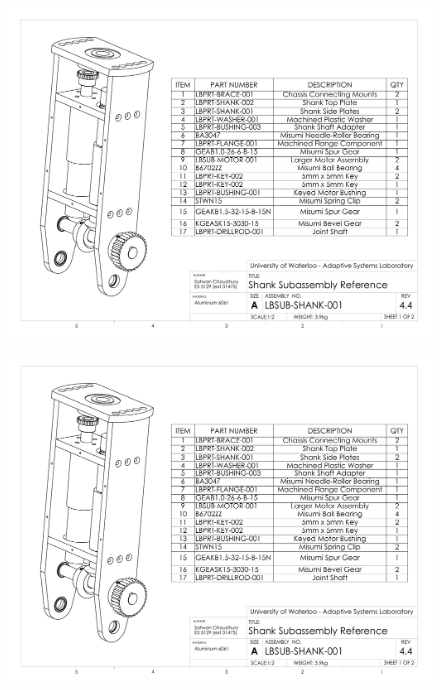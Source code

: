 \begin{figure}[!h]
	\begin{center}
    \includegraphics[scale=0.72,angle=90]{fig/drawings/lbsub-shank-001.pdf}
	\end{center}
\end{figure}

\begin{figure}[!h]
	\begin{center}
    \includegraphics[scale=0.72,angle=90,page=2]{fig/drawings/lbsub-shank-001.pdf}
	\end{center}
\end{figure}

